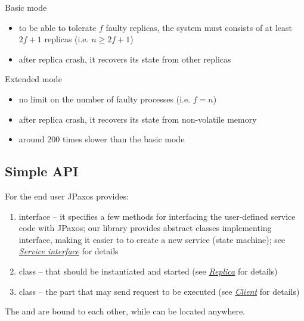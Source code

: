 Basic mode
\begin{itemize}
\item {} 
to be able to tolerate $f$ faulty replicas, the system must consists
of at least $2f + 1$ replicas (i.e. $n \ge 2f + 1$)

\item {} 
after replica crash, it recovers its state from other replicas

\end{itemize}

Extended mode
\begin{itemize}
\item {} 
no limit on the number of faulty processes (i.e. $f = n$)

\item {} 
after replica crash, it recovers its state from non-volatile memory

\item {} 
around 200 times slower than the basic mode

\end{itemize}


\subsection{Simple API}
\label{overview:simple-api}
For the end user JPaxos provides:
\begin{enumerate}
\item {} 
 interface -- it specifies a few methods for interfacing
the user-defined servi\-ce code with JPaxos; our library provides
abstract classes implementing  interface, making it easier to
to create a new service (state machine);\linebreak
see {\hyperref[api:jpaxos-service]{\emph{Service interface}}} for details

\item {} 
 class -- that should be instantiated and started
(see {\hyperref[api:jpaxos-replica]{\emph{Replica}}} for details)

\item {} 
 class -- the part that may send request to be executed
(see {\hyperref[api:jpaxos-client]{\emph{Client}}} for details)

\end{enumerate}

The  and  are bound to each other, while
 can be located anywhere.

